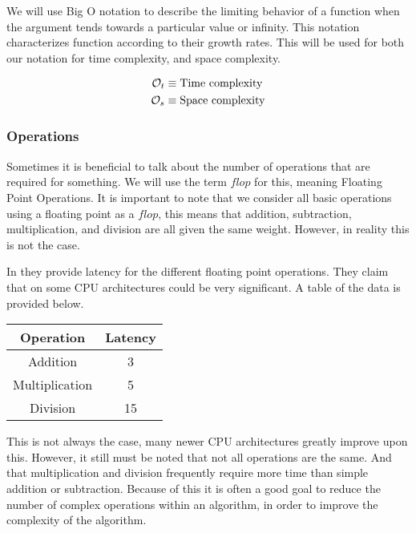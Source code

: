 \documentclass[../main.tex]{subfiles}
\begin{document}
We will use Big O notation to describe the limiting behavior of a function when
the argument tends towards a particular value or infinity. This notation
characterizes function according to their growth rates. This will be used for
both our notation for time complexity, and space complexity.

\begin{align*}
  \mathcal{O}_t &\equiv\text{Time complexity}\\
  \mathcal{O}_s &\equiv\text{Space complexity}\\
\end{align*}

\subsubsection{Operations}%
\label{ssub:operations}

Sometimes it is beneficial to talk about the number of operations that are
required for something. We will use the term $flop$ for this, meaning Floating
Point Operations. It is important to note that we consider all basic operations
using a floating point as a $flop$, this means that addition, subtraction,
multiplication, and division are all given the same weight. However, in reality
this is not the case.

In \cite{I_AORM} they provide latency for the different floating point
operations. They claim that on some CPU architectures could be very
significant. A table of the data is provided below.

\begin{center}
  \begin{tabular}{|c|c|}
    \hline
    Operation & Latency \\
    \hline
    \hline
    Addition & 3 \\
    \hline
    Multiplication & 5 \\
    \hline
    Division & 15 \\
    \hline
  \end{tabular}
\end{center}

This is not always the case, many newer CPU architectures greatly improve upon
this. However, it still must be noted that not all operations are the same. And
that multiplication and division frequently require more time than simple
addition or subtraction. Because of this it is often a good goal to reduce the
number of complex operations within an algorithm, in order to improve the
complexity of the algorithm.
\end{document}
